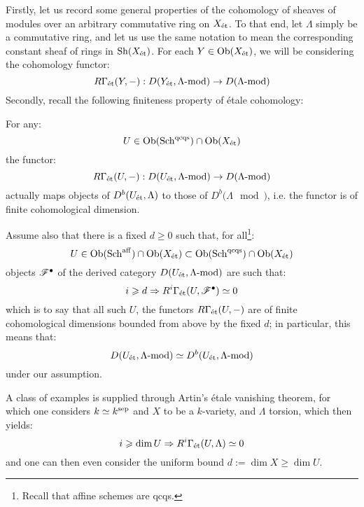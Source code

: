             Firstly, let us record some general properties of the cohomology of sheaves of modules over an arbitrary commutative ring on $X_{\mathrm{\acute{e}t}}$. To that end, let $\Lambda$ simply be a commutative ring, and let us use the same notation to mean the corresponding constant sheaf of rings in $\mathrm{Sh}(X_{\mathrm{\acute{e}t}})$. For each $Y \in \mathrm{Ob}(X_{\mathrm{\acute{e}t}})$, we will be considering the cohomology functor:
                $$R\Gamma_{\mathrm{\acute{e}t}}(Y, -): D(Y_{\mathrm{\acute{e}t}}, \Lambda\text{-}\mathrm{mod}) \to D(\Lambda\text{-}\mathrm{mod})$$
            Secondly, recall the following finiteness property of \'etale cohomology:
            \begin{lemma} \label{lemma: finiteness_of_etale_cohomology}
                \cite[Lemma 6.4.2]{bhatt_scholze_2014_pro_etale} For any:
                    $$U \in \mathrm{Ob}(\mathrm{Sch}^{\mathrm{qc}\mathrm{qs}}) \cap \mathrm{Ob}(X_{\mathrm{\acute{e}t}})$$
                the functor:
                    $$R\Gamma_{\mathrm{\acute{e}t}}(U, -): D(U_{\mathrm{\acute{e}t}}, \Lambda\text{-}\mathrm{mod}) \to D(\Lambda\text{-}\mathrm{mod})$$
                actually maps objects of $D^b(U_{\mathrm{\acute{e}t}}, \Lambda)$ to those of $D^b(\Lambda\mod)$, i.e. the functor is of finite cohomological dimension.
            \end{lemma}

            \begin{convention}
                Assume also that there is a fixed $d \geq 0$ such that, for all\footnote{Recall that affine schemes are qcqs.}:
                    $$U \in \mathrm{Ob}(\mathrm{Sch}^{\mathrm{aff}}) \cap \mathrm{Ob}(X_{\mathrm{\acute{e}t}}) \subset \mathrm{Ob}(\mathrm{Sch}^{\mathrm{qc}\mathrm{qs}}) \cap \mathrm{Ob}(X_{\mathrm{\acute{e}t}})$$
                objects $\mathscr{F}^{\bullet}$ of the derived category $D(U_{\mathrm{\acute{e}t}}, \Lambda\text{-}\mathrm{mod})$ are such that:
                    $$i \geqslant d \Rightarrow R^i\Gamma_{\mathrm{\acute{e}t}}(U, \mathscr{F}^{\bullet}) \simeq 0$$
                which is to say that all such $U$, the functors $R\Gamma_{\mathrm{\acute{e}t}}(U, -)$ are of finite cohomological dimensions bounded from above by the fixed $d$; in particular, this means that:
                    $$D(U_{\mathrm{\acute{e}t}}, \Lambda\text{-}\mathrm{mod}) \simeq D^b(U_{\mathrm{\acute{e}t}}, \Lambda\text{-}\mathrm{mod})$$
                under our assumption. 
            \end{convention}
        
            \begin{example} \label{example: artin_etale_vanishing}
                A class of examples is supplied through Artin's \'etale vanishing theorem, for which one considers $k \simeq k^{\mathrm{sep}}$ and $X$ to be a $k$-variety, and $\Lambda$ torsion, which then yields:
                    $$i \geqslant \dim U \Rightarrow R^i\Gamma_{\mathrm{\acute{e}t}}(U, \Lambda) \simeq 0$$
                and one can then even consider the uniform bound $d := \dim X \geq \dim U$.
            \end{example}

